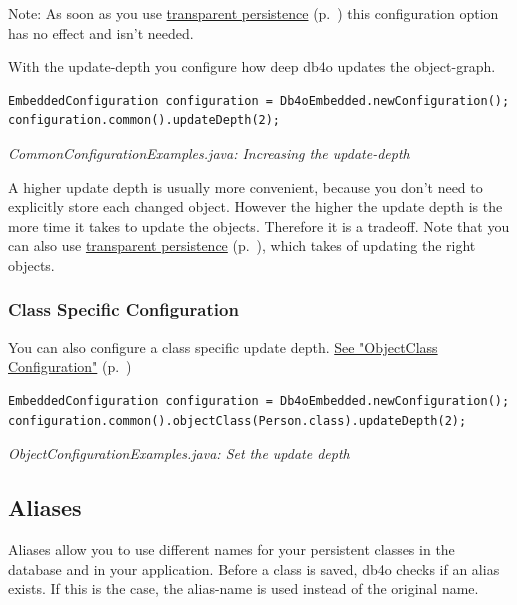 Note: As soon as you use \hyperref[ref:basics-transparent-persistence]{transparent persistence} (p.~\pageref{ref:basics-transparent-persistence}) this configuration option has no effect and isn't needed.

With the update-depth you configure how deep db4o updates the object-graph.

\begin{lstlisting}
EmbeddedConfiguration configuration = Db4oEmbedded.newConfiguration();
configuration.common().updateDepth(2);
\end{lstlisting}

{\small\itshape CommonConfigurationExamples.java: Increasing the update-depth\par}
\medskip

A higher update depth is usually more convenient, because you don't need to explicitly store each changed object. However the higher the update depth is the more time it takes to update the objects. Therefore it is a tradeoff. Note that you can also use \hyperref[ref:basics-update-concept-transparent-persistence]{transparent persistence} (p.~\pageref{ref:basics-update-concept-transparent-persistence}), which takes of updating the right objects.

\subsubsection*{Class Specific Configuration}

You can also configure a class specific update depth. \hyperref[ref:configuration-objectclass-configuration]{See "ObjectClass Configuration"} (p.~\pageref{ref:configuration-objectclass-configuration})

\begin{lstlisting}
EmbeddedConfiguration configuration = Db4oEmbedded.newConfiguration();
configuration.common().objectClass(Person.class).updateDepth(2);
\end{lstlisting}

{\small\itshape ObjectConfigurationExamples.java: Set the update depth\par}
\medskip

\subsection{Aliases}
\label{ref:configuration-common-alias}

Aliases allow you to use different names for your persistent classes in the database and in your application. Before a class is saved, db4o checks if an alias exists. If this is the case, the alias-name is used instead of the original name.

